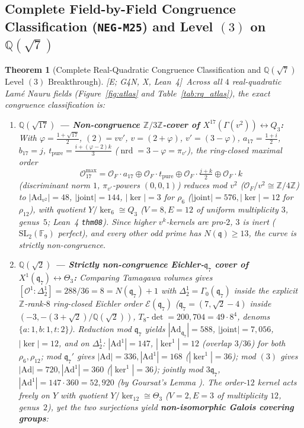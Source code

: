 \documentclass[11pt]{amsart}
\numberwithin{equation}{section}
\theoremstyle{plain}
\newtheorem{theorem}{Theorem}[section]
\theoremstyle{definition}\newtheorem{definition}[theorem]{Definition}
\theoremstyle{remark}\newtheorem{remark}[theorem]{Remark}
\newcommand{\Q}{\mathbb{Q}}
\newcommand{\Z}{\mathbb{Z}}
\newcommand{\F}{\mathbb{F}}
\newcommand{\calO}{\mathcal{O}}
\newcommand{\calE}{\mathcal{E}}
\newcommand{\frq}{\mathfrak{q}}
\newcommand{\SL}{\mathrm{SL}}
\newcommand{\Ad}{\mathrm{Ad}}
\newcommand{\nrd}{\operatorname{nrd}}
\newcommand{\ctag}[1]{\textup{\textsf{\scriptsize[#1]}}}
\begin{document}
\subsection{Complete Field-by-Field Congruence Classification (\texorpdfstring{\texttt{NEG-M25}}{NEG-M25}) and Level \texorpdfstring{$(3)$}{(3)} on \texorpdfstring{$\Q(\sqrt{7})$}{Q(sqrt(7))}}\label{sec:rq_classification}
\begin{theorem}[Complete Real-Quadratic Congruence Classification and $\Q(\sqrt{7})$ Level $(3)$ Breakthrough]\label{thm:rq_atlas}
\ctag{E; G4N, X, Lean~4}\ Across all $4$ real-quadratic Lam\'e Nauru fields (Figure~\ref{fig:atlas} and Table~\ref{tab:rq_atlas}), the exact congruence classification is:
\begin{enumerate}[label=(\arabic*),nosep]
\item \textbf{$\Q(\sqrt{17})$ --- Non-congruence $\Z/3\Z$-cover of $X^{17}(\Gamma(v^2))\leftrightarrow Q_3$:} With $\varphi=\frac{1+\sqrt{17}}{2}$, $(2)=vv'$, $v=(2+\varphi)$, $v'=(3-\varphi)$, $a_{17}=\frac{1+i}{2}$, $b_{17}=j$, $t_{\mathrm{pure}}=\frac{i+(\varphi-2)k}{3}$ ($\nrd=3-\varphi=\pi_{v'}$), the ring-closed maximal order
\[
\calO_{17}^{\max} = \calO_F\cdot a_{17} \oplus \calO_F\cdot t_{\mathrm{pure}} \oplus \calO_F\cdot \tfrac{j+k}{2} \oplus \calO_F\cdot k
\]
(discriminant norm $1$, $\pi_{v'}$-powers $(0,0,1)$) reduces mod $v^2$ ($\calO_F/v^2\cong\Z/4\Z$) to $|\Ad_{v^2}|=48$, $|\mathrm{joint}|=144$, $|\ker|=3$ for $\rho_6$ ($|\mathrm{joint}|=576, |\ker|=12$ for $\rho_{12}$), with quotient $Y/\ker_6 \cong Q_3$ ($V=8, E=12$ of uniform multiplicity $3$, genus~$5$; Lean~4 \texttt{thm08}). Since higher $v^k$-kernels are pro-$2$, $3$ is inert ($\SL_2(\F_9)$ perfect), and every other odd prime has $N(\frq)\ge 13$, the curve is strictly non-congruence.
\item \textbf{$\Q(\sqrt{2})$ --- Strictly non-congruence Eichler-$\frq_7$ cover of $X^1(\frq_7)\leftrightarrow\Theta_3$:} Comparing Tamagawa volumes gives $[\calO^1 : \Delta_2^1] = 288/36 = 8 = N(\frq_7)+1$ with $\Delta_2^1 = \Gamma_0(\frq_7)$ inside the explicit $\Z$-rank-$8$ ring-closed Eichler order $\calE(\frq_7)$ ($\frq_7=(7,\sqrt{2}-4)$ inside $(-3,-(3+\sqrt{2})/\Q(\sqrt{2}))$, $T_8\text{-}\det = 200{,}704 = 49\cdot 8^4$, denoms $\{a:1,b:1,t:2\}$). Reduction mod $\frq_7$ yields $|\Ad_{\frq_7}|=588$, $|\mathrm{joint}|=7{,}056$, $|\ker|=12$, and on $\Delta_2^1$: $|\Ad^1|=147$, $|\ker^1|=12$ (overlap $3/36$) for both $\rho_6,\rho_{12}$; mod $\frq_7'$ gives $|\Ad|=336, |\Ad^1|=168$ ($|\ker^1|=36$); mod $(3)$ gives $|\Ad|=720, |\Ad^1|=360$ ($|\ker^1|=36$); jointly mod $3\frq_7$, $|\Ad^1|=147\cdot 360=52{,}920$ (by Goursat's Lemma \cite{goursat1889}). The order-$12$ kernel acts freely on $Y$ with quotient $Y/\ker_{12} \cong \Theta_3$ ($V=2, E=3$ of multiplicity $12$, genus~$2$), yet the two surjections yield \textbf{non-isomorphic Galois covering groups}:

\end{enumerate}
\end{theorem}
\end{document}
